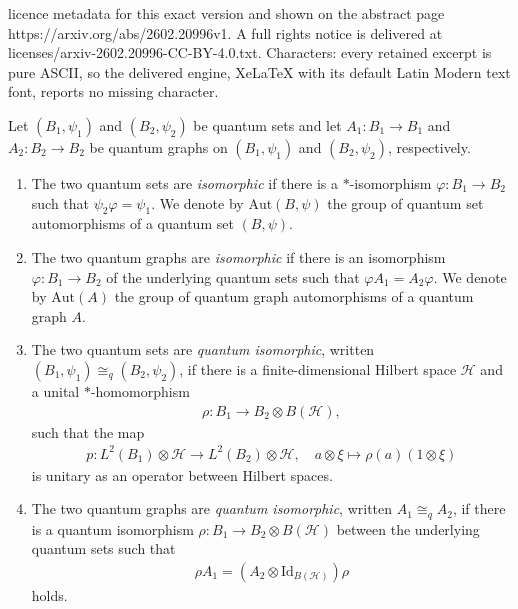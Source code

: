 \documentclass[10pt,a4paper]{amsart}
\begin{document}
licence metadata for this exact version and shown on the abstract page https://arxiv.org/abs/2602.20996v1. A full rights notice is delivered at licenses/arxiv-2602.20996-CC-BY-4.0.txt. Characters: every retained excerpt is pure ASCII, so the delivered engine, XeLaTeX with its default Latin Modern text font, reports no missing character.
\begin{definition}
    \label{pre::def:qisomoprhisms_of_qsets_and_qgraphs}
    Let $(B_1, \psi_1)$ and $(B_2, \psi_2)$ be quantum sets and let $A_1: B_1 \to B_1$ and $A_2: B_2 \to B_2$ be quantum graphs on $(B_1, \psi_1)$ and $(B_2, \psi_2)$, respectively.
    \begin{enumerate}
        \item The two quantum sets are \emph{isomorphic} if there is a $*$-isomorphism $\varphi: B_1 \to B_2$ such that $\psi_2 \varphi = \psi_1$. We denote by $\mathrm{Aut}(B, \psi)$ the group of quantum set automorphisms of a quantum set $(B, \psi)$.
        \item The two quantum graphs are \emph{isomorphic} if there is an isomorphism $\varphi: B_1 \to B_2$ of the underlying quantum sets such that $\varphi A_1 = A_2 \varphi$. We denote by $\mathrm{Aut}(A)$ the group of quantum graph automorphisms of a quantum graph $A$.
        \item The two quantum sets are \emph{quantum isomorphic}, written $(B_1, \psi_1) \cong_q (B_2, \psi_2)$, if there is a finite-dimensional Hilbert space $\mathcal{H}$ and a unital $\ast$-homomorphism  
        \begin{align*}
            \rho: B_1 \to B_2 \otimes B(\mathcal{H}),
        \end{align*}
        such that the map
        \begin{align*}
            p: L^2(B_1) \otimes \mathcal{H} \to L^2(B_2) \otimes \mathcal{H}, \quad a \otimes \xi \mapsto \rho(a)(1 \otimes \xi)
        \end{align*}
        is unitary as an operator between Hilbert spaces.
        \item The two quantum graphs are \emph{quantum isomorphic}, written $A_1 \cong_q A_2$, if there is a quantum isomorphism $\rho: B_1 \to B_2 \otimes B(\mathcal{H})$ between the underlying quantum sets such that
        \begin{align*}
            \rho A_1 = (A_2 \otimes \mathrm{Id}_{B(\mathcal{H})}) \rho
        \end{align*}
        holds.
    \end{enumerate}
\end{definition}
\end{document}
